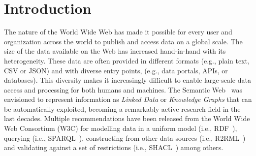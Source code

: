 \chapter{Introduction}
\label{chapter:intro}





The nature of the World Wide Web has made it possible for every user and organization across the world to publish and access data on a global scale. 
The size of the data available on the Web has increased hand-in-hand with its heterogeneity. 
These data are often provided in different formats (e.g., plain text, CSV or JSON) and with diverse entry points, (e.g., data portals, APIs, or databases). 
This diversity makes it increasingly difficult to enable large-scale data access and processing for both humans and machines.
The Semantic Web~\parencite{berners2001semantic} was envisioned to represent information as \textit{Linked Data} or \textit{Knowledge Graphs} that can be automatically exploited, becoming a remarkably active research field in the last decades.
Multiple recommendations have been released from the World Wide Web Consortium (W3C) for modelling data in a uniform model (i.e., RDF~\parencite{rdf}), querying (i.e., SPARQL~\parencite{harris2013sparql}), constructing from other data sources (i.e., R2RML~\parencite{das2012r2rml}) and validating against a set of restrictions (i.e., SHACL~\parencite{SHACL}) among others. 

